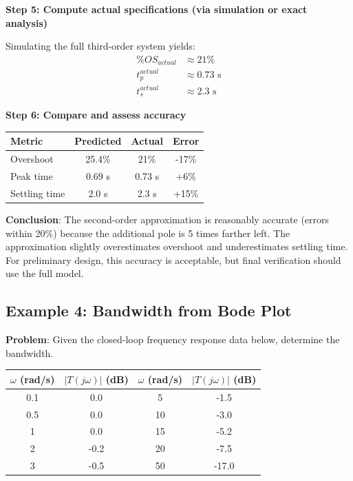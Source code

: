 \textbf{Step 5: Compute actual specifications (via simulation or exact analysis)}

Simulating the full third-order system yields:
\begin{align}
    \%OS_{actual} &\approx 21\% \\
    t_p^{actual} &\approx 0.73 \text{ s} \\
    t_s^{actual} &\approx 2.3 \text{ s}
\end{align}

\textbf{Step 6: Compare and assess accuracy}

\begin{center}
\begin{tabular}{lccc}
\toprule
\textbf{Metric} & \textbf{Predicted} & \textbf{Actual} & \textbf{Error} \\
\midrule
Overshoot & 25.4\% & 21\% & -17\% \\
Peak time & 0.69 s & 0.73 s & +6\% \\
Settling time & 2.0 s & 2.3 s & +15\% \\
\bottomrule
\end{tabular}
\end{center}

\textbf{Conclusion}: The second-order approximation is reasonably accurate (errors within 20\%) because the additional pole is 5 times farther left. The approximation slightly overestimates overshoot and underestimates settling time. For preliminary design, this accuracy is acceptable, but final verification should use the full model.

\subsection{Example 4: Bandwidth from Bode Plot}

\textbf{Problem}: Given the closed-loop frequency response data below, determine the bandwidth.

\begin{center}
\begin{tabular}{cc|cc}
\toprule
$\omega$ (rad/s) & $|T(j\omega)|$ (dB) & $\omega$ (rad/s) & $|T(j\omega)|$ (dB) \\
\midrule
0.1 & 0.0 & 5 & -1.5 \\
0.5 & 0.0 & 10 & -3.0 \\
1 & 0.0 & 15 & -5.2 \\
2 & -0.2 & 20 & -7.5 \\
3 & -0.5 & 50 & -17.0 \\
\bottomrule
\end{tabular}
\end{center}

